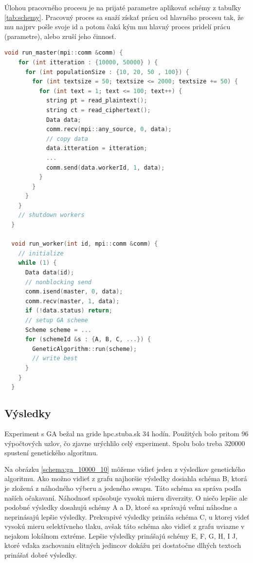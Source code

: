 Úlohou pracovného procesu je na prijaté parametre aplikovať schémy z tabuľky \ref{tab:schemy}.
Pracovný proces sa snaží získať prácu od hlavného procesu tak,
že mu najprv pošle svoje id a potom čaká kým mu hlavný proces pridelí prácu (parametre), alebo zruší jeho činnosť.

\begin{lstlisting}[language=c++, caption={Pseudokód ditribúcie parametrov GA}]
  void run_master(mpi::comm &comm) {
    for (int itteration : {10000, 50000} ) {
      for (int populationSize : {10, 20, 50 , 100}) {
        for (int textsize = 50; textsize <= 2000; textsize += 50) {
          for (int text = 1; text <= 100; text++) {
            string pt = read_plaintext();
            string ct = read_ciphertext();
            Data data;
            comm.recv(mpi::any_source, 0, data);
            // copy data
            data.itteration = itteration;
            ...
            comm.send(data.workerId, 1, data);
          }
        }
      } 
    }
    // shutdown workers
  }

  void run_worker(int id, mpi::comm &comm) {
    // initialize
    while (1) {
      Data data(id);
      // nonblocking send 
      comm.isend(master, 0, data);
      comm.recv(master, 1, data);
      if (!data.status) return;
      // setup GA scheme
      Scheme scheme = ...
      for (schemeId &s : {A, B, C, ...}) {
        GeneticAlgorithm::run(scheme);
        // write best
      }
    }
  }
\end{lstlisting}
\subsection{Výsledky}
Experiment s GA bežal na gride hpc.stuba.sk 34 hodín.
Použitých bolo pritom 96 výpočtových uzlov, čo zjavne urýchlilo celý experiment.
Spolu bolo treba 320000 spustení genetického algoritmu.

Na obrázku \ref{schema:ga_10000_10} môžeme vidieť jeden z výsledkov genetického algoritmu.
Ako možno vidieť z grafu najhoršie výsledky dosiahla schéma B, ktorá je zložená z náhodného výberu a jedeného swapu. Táto schéma sa správa podľa naších očakavaní. Náhodnosť spôsobuje vysokú mieru diverzity.
O niečo lepšie ale podobné výsledky dosahujú schémy A a D, ktoré sa správajú veľmi náhodne a neprinásajú lepšie výsledky.
Prekvapivé výsledky prináša schéma C, u ktorej videť vysokú mieru selektívneho tlaku, avšak táto schéma ako vidieť z grafu uviazne v nejakom lokálnom extréme.
Lepšie výsledky prinášajú schémy E, F, G, H, I J, ktoré vďaka zachovaniu elitných jedincov dokážu pri dostatočne dlhých textoch prinášať dobré výsledky.


